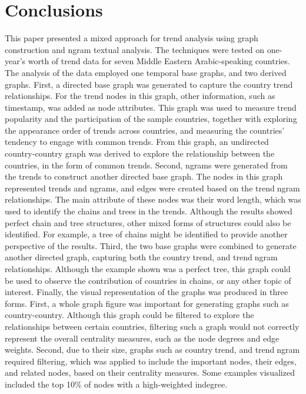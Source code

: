 \documentclass[conference]{IEEEtran}
\begin{document}
{\section{Conclusions}\label{conclusions}
This paper presented a mixed approach for trend analysis using graph construction and ngram textual analysis. The techniques were tested on one-year’s worth of trend data for seven Middle Eastern Arabic-speaking countries. The analysis of the data employed one temporal base graphs, and two derived graphs. 
First, a directed base graph was generated to capture the countrytrend relationships. For the trend nodes in this graph, other information, such as timestamp, was added as node attributes. This graph was used to measure trend popularity and the participation of the sample countries, together with exploring the appearance order of trends across countries, and measuring the countries’ tendency to engage with common trends. From this graph, an undirected country-country graph was derived to explore the relationship between the countries, in the form of common trends.
Second, ngrams were generated from the trends to construct another directed base graph. The nodes in this graph represented trends and ngrams, and edges were created based on the trendngram relationships. The main attribute of these nodes was their word length, which was used to identify the chains and trees in the trends. Although the results showed perfect chain and tree structures, other mixed forms of structures could also be identified. For example, a tree of chains might be identified to provide another perspective of the results.
Third, the two base graphs were combined to generate another directed graph, capturing both the countrytrend, and trendngram relationships. Although the example shown was a perfect tree, this graph could be used to observe the contribution of countries in chains, or any other topic of interest. 
Finally, the visual representation of the graphs was produced in three forms. First, a whole graph figure was important for generating graphs such as country-country. Although this graph could be filtered to explore the relationships between certain countries, filtering such a graph would not correctly represent the overall centrality measures, such as the node degrees and edge weights. Second, due to their size, graphs such as countrytrend, and trendngram required filtering, which was applied to include the important nodes, their edges, and related nodes, based on their centrality measures. Some examples visualized included the top 10\% of nodes with a high-weighted indegree. 
}
\end{document}

